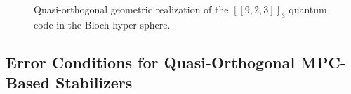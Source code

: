 \documentclass{iopjournal}
\theoremstyle{thmstyleone}%
\theoremstyle{thmstyletwo}%
\theoremstyle{thmstylethree}%
\begin{document}
\begin{figure}[H]
\begin{tikzpicture}[scale=1.2]
\end{tikzpicture}
\caption{Quasi-orthogonal geometric realization of the \([[9,2,3]]_3\) quantum code in the Bloch hyper-sphere. }
\label{fig:923-quasi-geo-bloch}
\end{figure}


\subsection{Error Conditions for Quasi-Orthogonal MPC-Based Stabilizers}
\label{subsec:qec-quasi-ortho}
\end{document}
